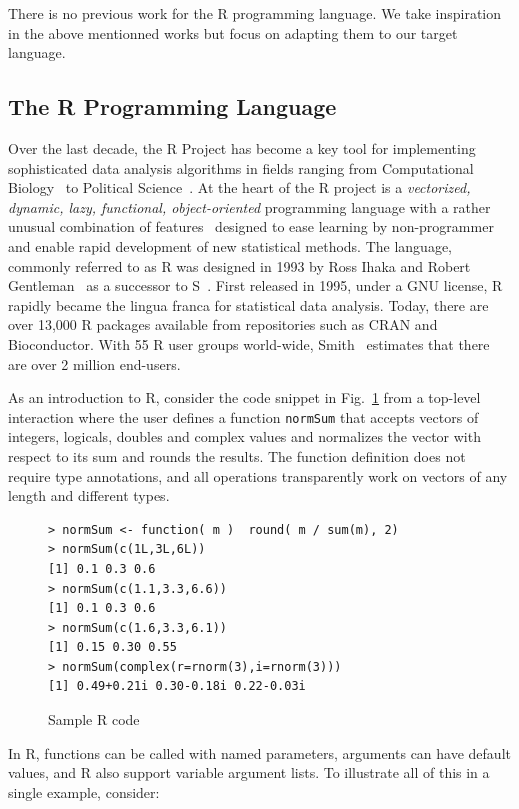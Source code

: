 \documentclass[acmsmall,review,anonymous]{acmart}\settopmatter{printfolios=true,printccs=false,printacmref=false}
\newcommand{\code}[1]{{\lstinline[style=Rin]!#1!}\xspace}
\begin{document}
There is no previous work for the R programming language. We take
inspiration in the above mentionned works but focus on adapting them to our
target language.


%
\subsection{The R Programming Language}

Over the last decade, the R Project has become a key tool for implementing
sophisticated data analysis algorithms in fields ranging from Computational
Biology~\cite{R05} to Political Science~\cite{R:Keele:2008}. At the heart of
the R project is a \emph{vectorized, dynamic, lazy, functional,
  object-oriented} programming language with a rather unusual combination of
features~\cite{ecoop12} designed to ease learning by non-programmer and
enable rapid development of new statistical methods.  The language, commonly
referred to as R was designed in 1993 by Ross Ihaka and Robert
Gentleman~\cite{R96} as a successor to S~\cite{S88}.  First released in
1995, under a GNU license, R rapidly became the lingua franca for
statistical data analysis. Today, there are over 13,000 R packages available
from repositories such as CRAN and Bioconductor.  With 55 R user groups
world-wide, Smith~\cite{eco11} estimates that there are over 2 million
end-users.

As an introduction to R, consider the code snippet in Fig.~\ref{sample} from
a top-level interaction where the user defines a function \code{normSum}
that accepts vectors of integers, logicals, doubles and complex values and
normalizes the vector with respect to its sum and rounds the results. The
function definition does not require type annotations, and all operations
transparently work on vectors of any length and different types.

\begin{figure}[!hb]{\begin{lstlisting}
> normSum <- function( m )  round( m / sum(m), 2)
> normSum(c(1L,3L,6L))
[1] 0.1 0.3 0.6
> normSum(c(1.1,3.3,6.6))
[1] 0.1 0.3 0.6
> normSum(c(1.6,3.3,6.1))
[1] 0.15 0.30 0.55
> normSum(complex(r=rnorm(3),i=rnorm(3)))
[1] 0.49+0.21i 0.30-0.18i 0.22-0.03i
\end{lstlisting}}
\caption{Sample R code}\label{sample}
\end{figure}

In R, functions can be called with named parameters, arguments can have
default values, and R also support variable argument lists.  To illustrate
all of this in a single example, consider:
\end{document}

